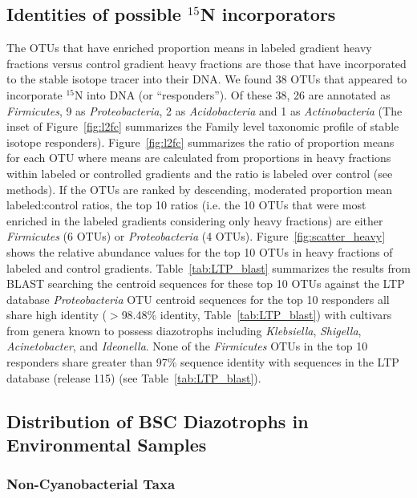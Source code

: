 \subsection{Identities of possible $^{15}$N incorporators}
The OTUs that have enriched proportion means in labeled gradient heavy
fractions versus control gradient heavy fractions are those that have
incorporated to the stable isotope tracer into their DNA. We found 38
OTUs that appeared to incorporate $^{15}$N into DNA (or ``responders''). Of
these 38, 26 are annotated as \textit{Firmicutes}, 9 as
\textit{Proteobacteria}, 2 as \textit{Acidobacteria} and 1 as
\textit{Actinobacteria} (The inset of Figure~\ref{fig:l2fc} summarizes the
Family level taxonomic profile of stable isotope responders).
Figure~\ref{fig:l2fc} summarizes the ratio of proportion means for each OTU
where means are calculated from proportions in heavy fractions within labeled
or controlled gradients and the ratio is labeled over control (see methods). If
the OTUs are ranked by descending, moderated proportion mean labeled:control
ratios, the top 10 ratios (i.e. the 10 OTUs that were most enriched in the
labeled gradients considering only heavy fractions) are either
\textit{Firmicutes} (6 OTUs) or \textit{Proteobacteria} (4 OTUs).
Figure~\ref{fig:scatter_heavy} shows the relative abundance values for the top
10 OTUs in heavy fractions of labeled and control gradients.
Table~\ref{tab:LTP_blast} summarizes the results from BLAST searching the
centroid sequences for these top 10 OTUs against the LTP database
\textit{Proteobacteria} OTU centroid sequences for the top 10 responders all
share high identity ($>$98.48\% identity, Table~\ref{tab:LTP_blast}) with
cultivars from genera known to possess diazotrophs including
\textit{Klebsiella}, \textit{Shigella}, \textit{Acinetobacter}, and
\textit{Ideonella}. None of the \textit{Firmicutes} OTUs in the top 10
responders share greater than 97\% sequence identity with sequences in the LTP 
database (release 115) (see Table~\ref{tab:LTP_blast}).

\subsection{Distribution of BSC Diazotrophs in Environmental Samples}
\subsubsection{Non-Cyanobacterial Taxa}
